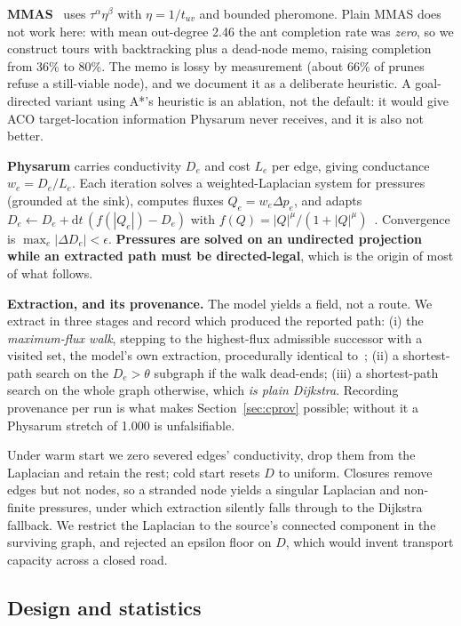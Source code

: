 \textbf{MMAS}~\cite{stutzle2000maxmin} uses $\tau^{\alpha}\eta^{\beta}$ with
$\eta = 1/t_{uv}$ and bounded pheromone. Plain MMAS does not work here: with
mean out-degree 2.46 the ant completion rate was \emph{zero}, so we
construct tours with backtracking plus a dead-node memo, raising completion
from 36\% to 80\%. The memo is lossy by measurement (about 66\% of prunes refuse a still-viable
node), and we document it as a deliberate heuristic.
A goal-directed variant using A*'s heuristic is an ablation, not the default:
it would give ACO target-location information Physarum never receives, and it
is also not better.

\textbf{Physarum} carries conductivity $D_e$ and cost $L_e$ per edge, giving
conductance $w_e = D_e/L_e$. Each iteration solves a weighted-Laplacian
system for pressures (grounded at the sink), computes fluxes
$Q_e = w_e \Delta p_e$, and adapts
$D_e \leftarrow D_e + \mathrm{d}t\,(f(|Q_e|) - D_e)$ with
$f(Q)=|Q|^{\mu}/(1+|Q|^{\mu})$~\cite{tero2007mathematical}. Convergence is
$\max_e|\Delta D_e| < \epsilon$. \textbf{Pressures are solved on an
undirected projection while an extracted path must be directed-legal}, which
is the origin of most of what follows.

\textbf{Extraction, and its provenance.} The model yields a field, not a
route. We extract in three stages and record which produced the reported
path: (i) the \emph{maximum-flux walk}, stepping to the highest-flux
admissible successor with a visited set, the model's own extraction,
procedurally identical to~\cite{wang2021transition}; (ii) a shortest-path
search on the $D_e > \theta$ subgraph if the walk dead-ends; (iii) a
shortest-path search on the whole graph otherwise, which \emph{is plain Dijkstra}. Recording provenance per run is what makes
Section~\ref{sec:cprov} possible; without it a Physarum stretch of 1.000 is
unfalsifiable.

Under warm start we zero severed edges' conductivity, drop them from the
Laplacian and retain the rest; cold start resets $D$ to uniform. Closures
remove edges but not nodes, so a stranded node yields a singular Laplacian
and non-finite pressures, under which extraction silently falls through to
the Dijkstra fallback. We restrict the Laplacian to the source's connected
component in the surviving graph, and rejected an epsilon floor on $D$, which
would invent transport capacity across a closed road.

\subsection{Design and statistics}

